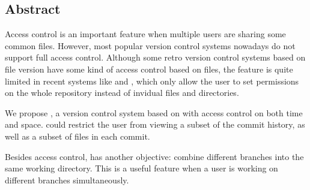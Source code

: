 \subsection*{Abstract}

Access control is an important feature when multiple users are sharing some
common files. However, most popular version control systems nowadays do not
support full access control. Although some retro version control systems based
on file version have some kind of access control based on files, the feature is
quite limited in recent systems like \git and \mercurial, which only allow the
user to set permissions on the whole repository instead of invidual files and
directories.

We propose \sys, a version control system based on \git with access control on
both time and space. \Sys could restrict the user from viewing a subset of the
commit history, as well as a subset of files in each commit.

Besides access control, \sys has another objective: combine different branches
into the same working directory. This is a useful feature when a user is working on
different branches simultaneously.

